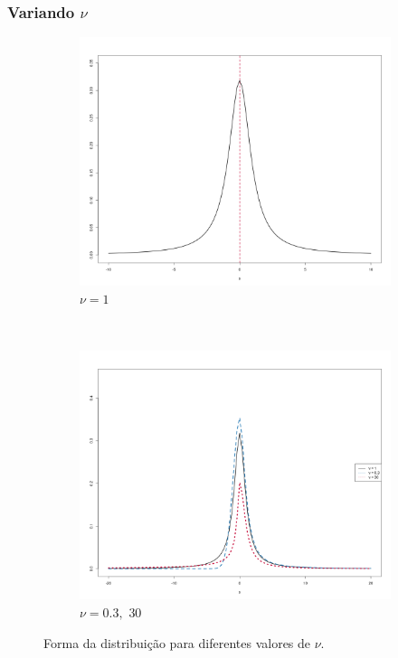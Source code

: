 \documentclass[13pt, aspectratio=169]{beamer}
\begin{document}
\begin{frame}
    \frametitle{Variando $\nu$}
    
    \begin{figure}[!ht]
        \centering
        \begin{subfigure}[t]{0.43\textwidth}
            \centering
            \includegraphics[width=\textwidth]{images/variando_mu_1.png}
            \caption{$\nu = 1$}
        \end{subfigure}%
        ~
        \begin{subfigure}[t]{0.43\textwidth}
            \centering
            \includegraphics[width=\textwidth]{images/variando_nu_2.png}
            \caption{$\nu = 0.3, \,\, 30$}
        \end{subfigure}%
        \caption{Forma da distribuição para diferentes valores de $\nu$.}
    \end{figure} 

\end{frame}
\end{document}
